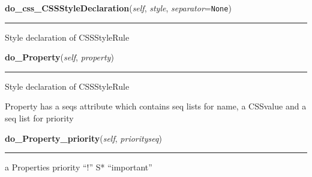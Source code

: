     \vspace{0.5ex}

\hspace{.8\funcindent}\begin{boxedminipage}{\funcwidth}

    \raggedright \textbf{do\_css\_CSSStyleDeclaration}(\textit{self}, \textit{style}, \textit{separator}={\tt None})

    \vspace{-1.5ex}

    \rule{\textwidth}{0.5\fboxrule}
\setlength{\parskip}{2ex}

Style declaration of CSSStyleRule
\setlength{\parskip}{1ex}
    \end{boxedminipage}

    \label{cssutils:serialize:CSSSerializer:do_Property}

    \vspace{0.5ex}

\hspace{.8\funcindent}\begin{boxedminipage}{\funcwidth}

    \raggedright \textbf{do\_Property}(\textit{self}, \textit{property})

    \vspace{-1.5ex}

    \rule{\textwidth}{0.5\fboxrule}
\setlength{\parskip}{2ex}

Style declaration of CSSStyleRule

Property has a seqs attribute which contains seq lists for
name, a CSSvalue and a seq list for priority
\setlength{\parskip}{1ex}
    \end{boxedminipage}

    \label{cssutils:serialize:CSSSerializer:do_Property_priority}

    \vspace{0.5ex}

\hspace{.8\funcindent}\begin{boxedminipage}{\funcwidth}

    \raggedright \textbf{do\_Property\_priority}(\textit{self}, \textit{priorityseq})

    \vspace{-1.5ex}

    \rule{\textwidth}{0.5\fboxrule}
\setlength{\parskip}{2ex}

a Properties priority ``!'' S* ``important''
\setlength{\parskip}{1ex}
    \end{boxedminipage}

